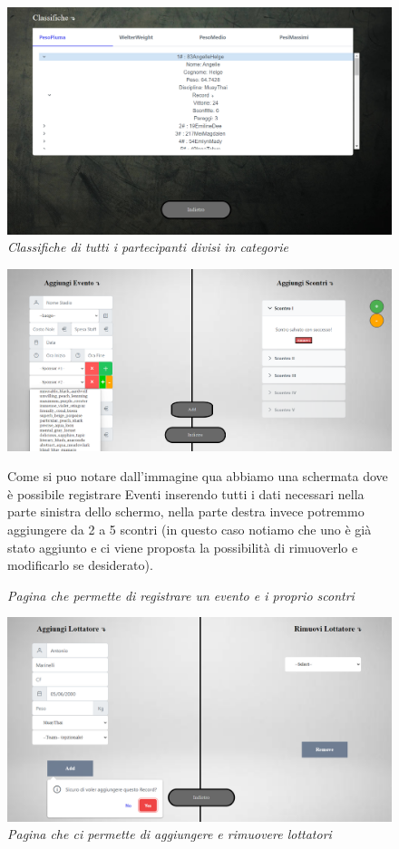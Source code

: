 \documentclass[a4paper,12pt]{report}
\begin{document}
\begin{figure}
    \centering
    \includegraphics[scale=0.4]{./img/classifiche.png}
    \caption{\textit{Classifiche di tutti i partecipanti divisi in categorie}}
    \label{categoria}
\end{figure}

\begin{figure}
    \centering
    \includegraphics[scale=0.35]{./img/eventoAdd.png}
    \caption{\textit{Pagina che permette di registrare un evento e i proprio scontri}}
    \medskip
    Come si puo notare dall'immagine qua abbiamo una schermata dove è possibile registrare Eventi inserendo tutti i dati necessari nella 
    parte sinistra dello schermo, nella parte destra invece potremmo aggiungere da 2 a 5 scontri (in questo caso notiamo che 
    uno è già stato aggiunto e ci viene proposta la possibilità di rimuoverlo e modificarlo se desiderato).
    \label{addEvento}
\end{figure}

\begin{figure}
    \centering
    \includegraphics[scale=0.4]{./img/AddLottatore.png}
    \caption{\textit{Pagina che ci permette di aggiungere e rimuovere lottatori}}
\end{figure}
\end{document}
